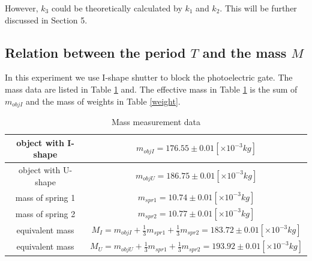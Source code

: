     However, $k_3$ could be theoretically calculated by $k_1$ and $k_2$. This will be further discussed in Section 5.\\

\subsection{Relation between the period $T$ and the mass $M$}
    In this experiment we use I-shape shutter to block the photoelectric gate. The mass data are listed in Table \ref{M} and. The effective mass in Table \ref{M} is the sum of $m_{objI}$ and the mass of weights in Table \ref{weight}.

    \begin{table}[h]
        \centering
        \begin{tabular}{|c|c|}
            \hline
            object with I-shape & $m_{objI}=176.55\pm 0.01[\times10^{-3}kg]$\\ \hline
            object with U-shape & $m_{objU}=186.75\pm 0.01[\times10^{-3}kg]$\\ \hline
            mass of spring 1 & $m_{spr1}=10.74\pm 0.01[\times10^{-3}kg]$\\ \hline
            mass of spring 2 & $m_{spr2}=10.77\pm 0.01[\times10^{-3}kg]$\\ \hline
            equivalent mass & $M_I=m_{objI}+\frac{1}{3}m_{spr1}+\frac{1}{3}m_{spr2}=183.72\pm 0.01[\times10^{-3}kg]$\\ \hline
            equivalent mass & $M_U=m_{objU}+\frac{1}{3}m_{spr1}+\frac{1}{3}m_{spr2}=193.92\pm 0.01[\times10^{-3}kg]$\\ \hline
        \end{tabular}
        \caption{Mass measurement data}\label{M}
    \end{table}
    \vspace{1cm}
